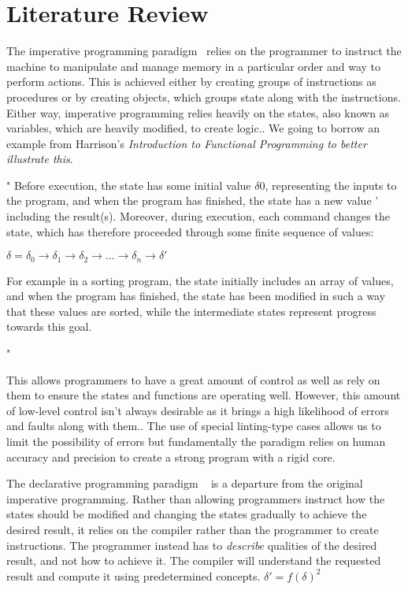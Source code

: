 \section{Literature Review}

The imperative programming paradigm~\cite{fourProgrammingParadigm} relies on the programmer to instruct the machine to manipulate and manage memory in a particular order and way to perform actions. This is achieved either by creating groups of instructions as procedures\cite[Ishida1991]{ishida1991use} or by creating objects\cite[Lewis 2009]{lewis2009java}, which groups state along with the instructions. Either way, imperative programming relies heavily on the states, also known as variables, which are heavily modified, to create logic.\cite[Harrison 1997]{harrison1997introduction}. We going to borrow an example from Harrison's \emph{Introduction to Functional Programming to better illustrate this}.

"
    Before execution, the state has some initial value $\delta 0$, representing the inputs to the program, and when the program has finished, the state has a new value \delta' including the result(s). Moreover, during execution, each command changes the state, which has therefore proceeded through some finite sequence of values:

    $\delta = \delta_0 \rightarrow \delta_1 \rightarrow \delta_2 \rightarrow \ldots \rightarrow \delta_n \rightarrow \delta'$

    For example in a sorting program, the state initially includes an array of values, and when the program has finished, the state has been modified in such a way that these values are sorted, while the intermediate states represent progress towards this goal.

"

This allows programmers to have a great amount of control as well as rely on them to ensure the states and functions are operating well. However, this amount of low-level control isn't always desirable as it brings a high likelihood of errors and faults along with them.\cite[Ko 2005]{ko2005framework}. The use of special linting-type cases allows us to limit the possibility of errors but fundamentally the paradigm relies on human accuracy and precision to create a strong program with a rigid core.

The declarative programming paradigm ~\cite{fourProgrammingParadigm} is a departure from the original imperative programming. Rather than allowing programmers instruct how the states should be modified and changing the states gradually to achieve the desired result, it relies on the compiler rather than the programmer to create instructions. The programmer instead has to \emph{describe} qualities of the desired result, and not how to achieve it. The compiler will understand the requested result and compute it using predetermined concepts. $\delta' = f(\delta)^2$


